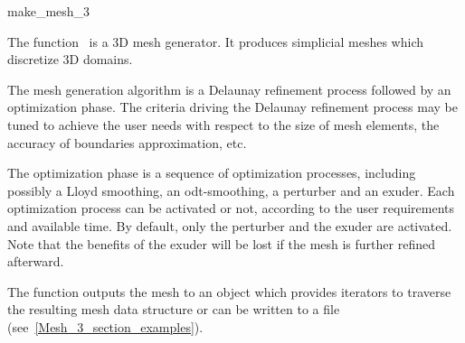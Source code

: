\ccRefPageBegin


\begin{ccRefFunction}{make_mesh_3}  %


\ccDefinition

The function \ccRefName\ is a 3D
 mesh generator. It produces simplicial meshes which discretize
 3D domains.

The mesh generation algorithm is a Delaunay refinement process
followed by an optimization phase. 
The  criteria driving the Delaunay refinement
process may be tuned to achieve the user needs with respect to
the size of mesh elements, the accuracy of boundaries approximation,
etc.

The optimization phase is a sequence of optimization processes,
including possibly a Lloyd smoothing, an odt-smoothing,
a perturber and an exuder.
 Each optimization process
can be activated or not,
 according to the user requirements
and available time. 
By default, only the perturber and the exuder are activated.
Note that the benefits of the exuder will be lost if the mesh
is further refined afterward.
 
The function outputs the mesh to an object which provides iterators to
traverse the resulting mesh data structure or can be written to a file
(see~\ref{Mesh_3_section_examples}).




\end{ccRefFunction}
